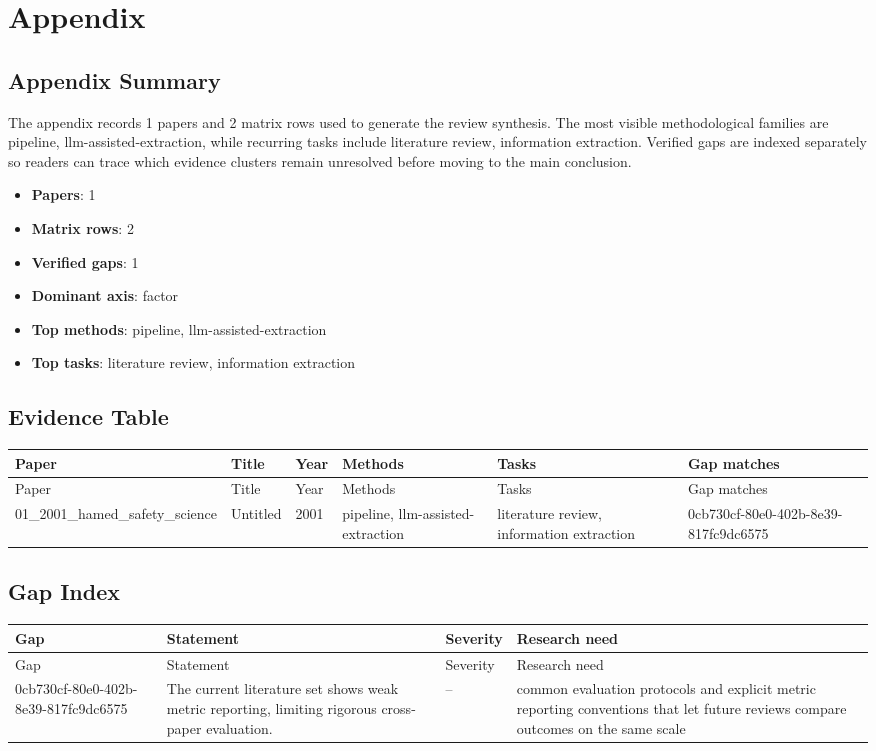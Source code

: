 \documentclass{article}
\begin{document}
\appendix
\section{Appendix}
\subsection{Appendix Summary}
\noindent The appendix records 1 papers and 2 matrix rows used to generate the review synthesis. The most visible methodological families are pipeline, llm-assisted-extraction, while recurring tasks include literature review, information extraction. Verified gaps are indexed separately so readers can trace which evidence clusters remain unresolved before moving to the main conclusion.

\begin{itemize}
\item \textbf{Papers}: 1
\item \textbf{Matrix rows}: 2
\item \textbf{Verified gaps}: 1
\item \textbf{Dominant axis}: factor
\item \textbf{Top methods}: pipeline, llm-assisted-extraction
\item \textbf{Top tasks}: literature review, information extraction
\end{itemize}

\subsection{Evidence Table}
\begin{longtable}{p{}p{}p{}p{}p{}p{}}
\toprule
Paper & Title & Year & Methods & Tasks & Gap matches \\
\midrule
\endfirsthead
\toprule
Paper & Title & Year & Methods & Tasks & Gap matches \\
\midrule
\endhead
01\_2001\_hamed\_safety\_science & Untitled & 2001 & pipeline, llm-assisted-extraction & literature review, information extraction & 0cb730cf-80e0-402b-8e39-817fc9dc6575 \\
\bottomrule
\end{longtable}

\subsection{Gap Index}
\begin{longtable}{p{}p{}p{}p{}}
\toprule
Gap & Statement & Severity & Research need \\
\midrule
\endfirsthead
\toprule
Gap & Statement & Severity & Research need \\
\midrule
\endhead
0cb730cf-80e0-402b-8e39-817fc9dc6575 & The current literature set shows weak metric reporting, limiting rigorous cross-paper evaluation. & -- & common evaluation protocols and explicit metric reporting conventions that let future reviews compare outcomes on the same scale \\
\bottomrule
\end{longtable}
\end{document}
